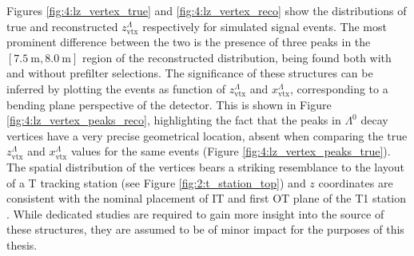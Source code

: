 Figures \ref{fig:4:lz_vertex_true} and \ref{fig:4:lz_vertex_reco} show the distributions of true and reconstructed $z_\text{vtx}^\Lambda$ respectively for simulated signal events.
The most prominent difference between the two is the presence of three peaks in the $[\SI{7.5}{\meter},\SI{8.0}{\meter}]$ region of the reconstructed distribution, being found both with and without prefilter selections. 
The significance of these structures can be inferred by plotting the events as function of  $z_\text{vtx}^\Lambda$ and $x_\text{vtx}^\Lambda$, corresponding to a bending plane perspective of the detector.
This is shown in Figure \ref{fig:4:lz_vertex_peaks_reco}, highlighting the fact that the peaks in $\Lambda^0$ decay vertices have a very precise geometrical location, absent when comparing the true $z_\text{vtx}^\Lambda$ and $x_\text{vtx}^\Lambda$ values for the same events (Figure \ref{fig:4:lz_vertex_peaks_true}).
The spatial distribution of the vertices bears a striking resemblance to the layout of a T tracking station (see Figure \ref{fig:2:t_station_top}) and $z$ coordinates are consistent with the nominal placement of IT and first OT plane of the T1 station \cite{Barbosa-Marinho:582793}.
While dedicated studies are required to gain more insight into the source of these structures, they are assumed to be of minor impact for the purposes of this thesis.

